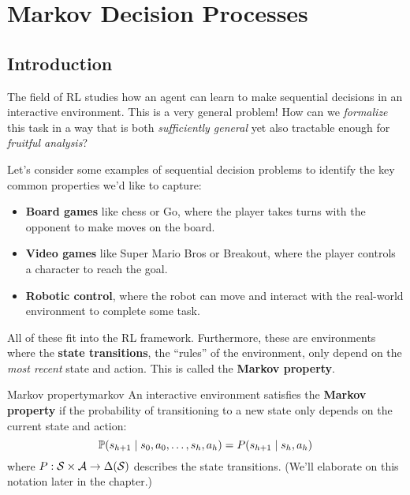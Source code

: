 \documentclass[\main/main]{subfiles}
\begin{document}
\chapter{Markov Decision Processes}

\tableofcontents

\newpage
\section{Introduction}

The field of RL studies how an agent can learn to make sequential decisions in an interactive environment. This is a very general problem! How can we \emph{formalize} this task in a way that is both \emph{sufficiently general} yet also tractable enough for \emph{fruitful analysis}?

Let's consider some examples of sequential decision problems to identify the key common properties we'd like to capture:

\begin{itemize}
    \item \textbf{Board games} like chess or Go, where the player takes turns with the opponent to make moves on the board.
    \item \textbf{Video games} like Super Mario Bros or Breakout, where the player controls a character to reach the goal.
    \item \textbf{Robotic control}, where the robot can move and interact with the real-world environment to complete some task.
\end{itemize}



All of these fit into the RL framework. Furthermore, these are environments where the \textbf{state transitions}, the ``rules'' of the environment, only depend on the \emph{most recent} state and action. This is called the \textbf{Markov property}.

\begin{definition}{Markov property}{markov}
    An interactive environment satisfies the \textbf{Markov property} if the probability of transitioning to a new state only depends on the current state and action:
    \[
        \P(s_{h+1} \mid s_0, a_0, \dots, s_h, a_h) = P(s_{h+1} \mid s_h, a_h)
    \]
    where $P : \S \times \A \to \Delta(\S)$ describes the state transitions. (We'll elaborate on this notation later in the chapter.)
\end{definition}
\end{document}
